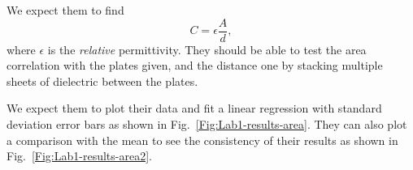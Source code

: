 \documentclass[12pt]{report}
\begin{document}
\begin{tcolorbox}[title=Expected result]
We expect them to find
\begin{equation}
C = \epsilon \frac{A}{d}, \nonumber
\end{equation}
where $\epsilon$ is the \textit{relative} permittivity. They should be able to test the area correlation with the plates given, and the distance one by stacking multiple sheets of dielectric between the plates.
\end{tcolorbox}

\begin{tcolorbox}
We expect them to plot their data and fit a linear regression with standard deviation error bars as shown in Fig.~\ref{Fig:Lab1-results-area}. They can also plot a comparison with the mean to see the consistency of their results as shown in Fig.~\ref{Fig:Lab1-results-area2}.
\end{tcolorbox}
\end{document}
